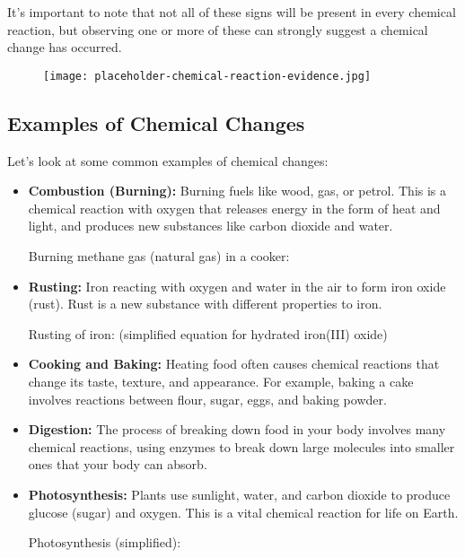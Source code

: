 It's important to note that not all of these signs will be present in every chemical reaction, but observing one or more of these can strongly suggest a chemical change has occurred.

\begin{figure}
\centering
\texttt{[image: placeholder-chemical-reaction-evidence.jpg]}
\end{figure}

\subsection{Examples of Chemical Changes}

Let's look at some common examples of chemical changes:

\begin{itemize}
    \item \textbf{Combustion (Burning):}  Burning fuels like wood, gas, or petrol. This is a chemical reaction with oxygen that releases energy in the form of heat and light, and produces new substances like carbon dioxide and water.
    \begin{example}
    Burning methane gas (natural gas) in a cooker:
    \end{example}
    \item \textbf{Rusting:} Iron reacting with oxygen and water in the air to form iron oxide (rust). Rust is a new substance with different properties to iron.
    \begin{example}
    Rusting of iron:
      (simplified equation for hydrated iron(III) oxide)
    \end{example}
    \item \textbf{Cooking and Baking:}  Heating food often causes chemical reactions that change its taste, texture, and appearance. For example, baking a cake involves reactions between flour, sugar, eggs, and baking powder.
    \item \textbf{Digestion:}  The process of breaking down food in your body involves many chemical reactions, using enzymes to break down large molecules into smaller ones that your body can absorb.
    \item \textbf{Photosynthesis:} Plants use sunlight, water, and carbon dioxide to produce glucose (sugar) and oxygen. This is a vital chemical reaction for life on Earth.
    \begin{example}
    Photosynthesis (simplified):
    \end{example}
\end{itemize}

